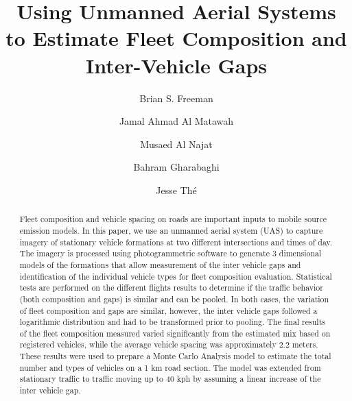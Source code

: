\documentclass[preprint,12pt,a4paper,authoryear]{elsarticle}
\title{Using Unmanned Aerial Systems to Estimate Fleet Composition and Inter-Vehicle Gaps}
\begin{document}
\maketitle

\begin{linenumbers}
\begin{frontmatter}

\author[add1]{Brian S. Freeman }

\author[add2]{Jamal Ahmad Al Matawah}

\author[add3]{Musaed Al Najat}

\author[add1]{Bahram Gharabaghi}

\author[add1,add4]{Jesse Th\'e }


\address[add1]{School of Engineering, University of Guelph, Guelph, Ontario, N1G 2W1, Canada}
\address[add2]{Public Authority for Applied Education and Training, Shuwaikh, Kuwait}
\address[add3]{Kuwait Traffic Safety Society, Shuwaikh, Kuwait}
\address[add4]{Lakes Environmental, 170 Columbia St W, Waterloo, Ontario, N2L 3L3 Canada}


\begin{abstract}
 Fleet composition and vehicle spacing on roads are important inputs to mobile source emission models. In this paper, we use an unmanned aerial system (UAS) to capture imagery of stationary vehicle formations at two different intersections and times of day. The imagery is processed using photogrammetric software to generate 3 dimensional models of the formations that allow measurement of the inter vehicle gaps and identification of the individual vehicle types for fleet composition evaluation. Statistical tests are performed on the different flights results to determine if the traffic behavior (both composition and gaps) is similar and can be pooled. In both cases, the variation of fleet composition and gaps are similar, however, the inter vehicle gaps followed a logarithmic distribution and had to be transformed prior to pooling. The final results of the fleet composition measured varied significantly from the estimated mix based on registered vehicles, while the average vehicle spacing was approximately 2.2 meters. These results were used to prepare a Monte Carlo Analysis model to estimate the total number and types of vehicles on a 1 km road section. The model was extended from stationary traffic to traffic moving up to 40 kph by assuming a linear increase of the inter vehicle gap.\\


\end{abstract}
\end{frontmatter}
\end{linenumbers}
\end{document}
